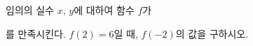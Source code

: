 임의의 실수 $x$, $y$에 대하여 함수 $f$가 \par\smallskip{}\par\smallskip\noindent 를 만족시킨다. $f(2)=6$일 때, $f(-2)$의 값을 구하시오.
